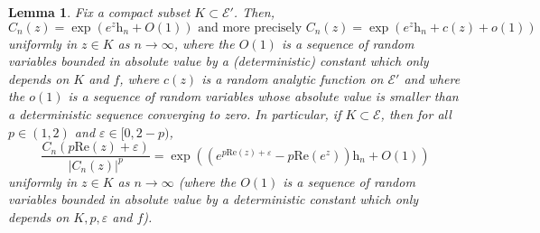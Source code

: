 \documentclass[11pt]{article}
\newtheorem{lemma}[theorem]{Lemma}
\numberwithin{equation}{section}
\def\vp{\varepsilon}
\renewcommand{\Re}{\mathrm{Re}}
\begin{document}
\begin{lemma}\label{lemme equivalent C n}
	Fix a compact subset $K \subset \mathcal{E}'$. Then,
	\[
	C_n(z) =  \exp\left(e^z\mathrm{h}_n +O(1) \right) \text{ and more precisely }
	C_n(z) = \exp\left( e^z \mathrm{h}_n+ c(z) +o(1) \right)
	\]
	uniformly in $z \in K$ as $n\to \infty$, where the $O(1)$ is a sequence of random variables bounded in absolute value by a (deterministic) constant which only depends on $K$ and $f$, where $c(z)$ is a random analytic function on $\mathcal{E}'$ and where the $o(1)$ is a sequence of random variables whose absolute value is smaller than a deterministic sequence converging to zero. In particular, if $K \subset \mathcal{E}$, then for all $p \in (1,2)$ and $\vp \in [0, 2-p)$,
	\[
	\frac{C_n(p \Re(z) + \vp)}{\vert C_n(z)\vert^p} = \exp\left( \left(e^{p \Re(z)+ \vp} - p \Re(e^z)\right) \mathrm{h}_n + O(1)\right)
	\]
	uniformly in $z \in K$ as $n\to \infty$ (where the $O(1)$ is a sequence of random variables bounded in absolute value by a deterministic constant which only depends on $K, p, \vp$ and $f$).
\end{lemma}
\end{document}
